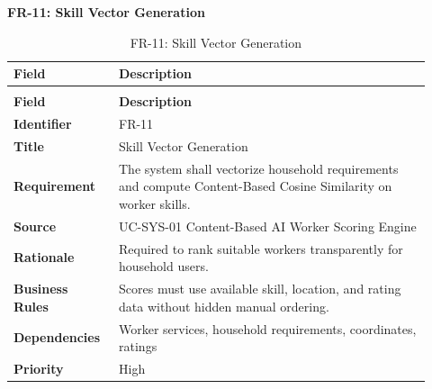 \documentclass[12pt,a4paper]{article}
\begin{document}
\noindent\textbf{FR-11: Skill Vector Generation}\par
\vspace{4pt}
\begingroup\small\setlength{\tabcolsep}{4pt}\renewcommand{\arraystretch}{1.15}
\begin{longtable}{|>{\raggedright\arraybackslash}p{0.22\linewidth}|>{\raggedright\arraybackslash}p{0.70\linewidth}|}
\caption{FR-11: Skill Vector Generation}\label{tab:fr-11}\\
\hline
\textbf{Field} & \textbf{Description} \\ \hline
\endfirsthead
\multicolumn{2}{c}{Table \thetable\ Skill Vector Generation (continued)}\\
\hline
\textbf{Field} & \textbf{Description} \\ \hline
\endhead
\textbf{Identifier} & FR-11 \\ \hline
\textbf{Title} & Skill Vector Generation \\ \hline
\textbf{Requirement} & The system shall vectorize household requirements and compute Content-Based Cosine Similarity on worker skills. \\ \hline
\textbf{Source} & UC-SYS-01 Content-Based AI Worker Scoring Engine \\ \hline
\textbf{Rationale} & Required to rank suitable workers transparently for household users. \\ \hline
\textbf{Business Rules} & Scores must use available skill, location, and rating data without hidden manual ordering. \\ \hline
\textbf{Dependencies} & Worker services, household requirements, coordinates, ratings \\ \hline
\textbf{Priority} & High \\ \hline
\end{longtable}
\endgroup
\end{document}

